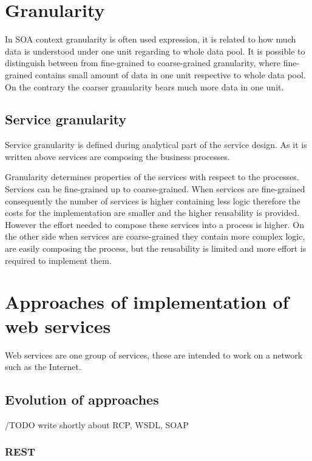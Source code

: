 
\section{Granularity}
\label{sec:granularity}
In SOA context granularity is often used expression, it is related to how much data is understood under one unit regarding to whole data pool. It is possible to distinguish between from fine-grained to coarse-grained granularity, where fine-grained contains small amount of data in one unit respective to whole data pool. On the contrary the coarser granularity bears much more data in one unit.

\subsection{Service granularity}
Service granularity is defined during analytical part of the service design. As it is written above services are composing the business processes.\par
Granularity determines properties of the services with respect to the processes. Services can be fine-grained up to coarse-grained. When services are fine-grained consequently the number of services is higher containing less logic therefore the costs for the implementation are smaller and the higher reusability is provided. However the effort needed to compose these services into a process is higher. 
On the other side when services are coarse-grained they contain more complex logic, are easily composing the process, but the reusability is limited and more effort is required to implement them.

\section{Approaches of implementation of web services}
Web services are one group of services, these are intended to work on a network such as the Internet.

\subsection{Evolution of approaches}
 
/TODO write shortly about RCP, WSDL, SOAP
 
\subsubsection{REST}

